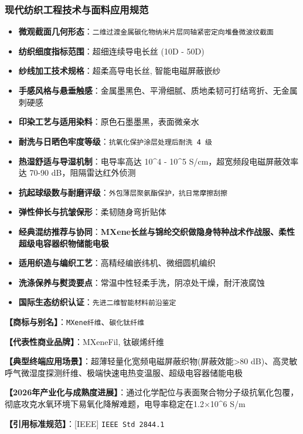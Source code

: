 \documentclass[11pt,openright,twoside,UTF8]{ctexbook}
\begin{document}
\subsubsection*{现代纺织工程技术与面料应用规范}
\begin{itemize} \setlength{\itemsep}{2pt}
    \item \textbf{微观截面几何形态}：\texttt{二维过渡金属碳化物纳米片层同轴紧密定向堆叠微波纹截面}
    \item \textbf{纺织细度指标范围}：超细连续导电长丝 (10D - 50D)
    \item \textbf{纱线加工技术规格}：超柔高导电长丝, 智能电磁屏蔽嵌纱
    \item \textbf{手感风格与悬垂触感}：金属墨黑色、平滑细腻、质地柔韧可打结弯折、无金属刺硬感
    \item \textbf{印染工艺与适用染料}：原色石墨墨黑，表面微亲水
    \item \textbf{耐洗与日晒色牢度等级}：\texttt{抗氧化保护涂层处理后耐洗 4 级}
    \item \textbf{热湿舒适与导湿机制}：电导率高达 10\textasciicircum{}4 - 10\textasciicircum{}5 S/cm，超宽频段电磁屏蔽效率达 70-90 dB，阻隔雷达红外侦测
    \item \textbf{抗起球级数与耐磨评级}：\texttt{外包薄层聚氨酯保护，抗日常摩擦刮擦}
    \item \textbf{弹性伸长与抗皱保形}：柔韧随身弯折贴体
    \item \textbf{经典混纺推荐与协同}：\textbf{MXene长丝与锦纶交织做隐身特种战术作战服、柔性超级电容器织物储能电极}
    \item \textbf{适用织造与编织工艺}：高精经编嵌纬机、微细圆机编织
    \item \textbf{洗涤保养与熨烫要点}：常温中性轻柔手洗，阴凉处干燥，耐汗液腐蚀
    \item \textbf{国际生态纺织认证}：\texttt{先进二维智能材料前沿鉴定}
\end{itemize}
\vspace{0.2cm}

\noindent\textbf{【商标与别名】}：\texttt{MXene纤维}、\texttt{碳化钛纤维}\par
\noindent\textbf{【代表性商业品牌】}：MXeneFil, 钛碳烯纤维\par
\noindent\textbf{【典型终端应用场景】}：超薄轻量化宽频电磁屏蔽织物(屏蔽效能\textgreater{}80 dB)、高灵敏呼气微湿度探测纤维、极端快速电热变温服、超级电容器储能电极\par
\noindent\textbf{【2026年产业化与成熟度进展】}：通过化学配位与表面聚合物分子级抗氧化包覆，彻底攻克水氧环境下易氧化降解难题，电导率稳定在1.2$\times$10\textasciicircum{}6 S/m\par
\noindent\textbf{【引用标准规范】}：[IEEE] \texttt{IEEE Std 2844.1}\par
\vspace{0.5cm}
\end{document}
